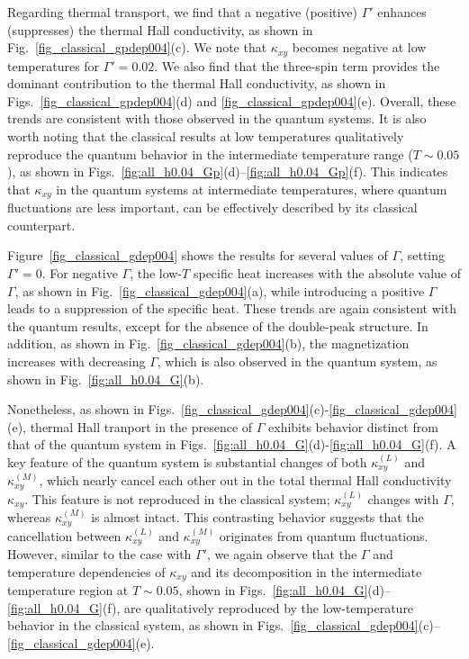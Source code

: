 \documentclass[twocolumn,superscriptaddress,showpacs, longbibliography, aps, prx]{revtex4-2}
\begin{document}
Regarding thermal transport, we find that a negative (positive) $\Gamma'$ enhances (suppresses) the thermal Hall conductivity, as shown in Fig.~\ref{fig_classical_gpdep004}(c).
We note that $\kappa_{xy}$ becomes negative at low temperatures for $\Gamma'=0.02$.
We also find that the three-spin term provides the dominant contribution to the thermal Hall conductivity, as shown in Figs.~\ref{fig_classical_gpdep004}(d) and \ref{fig_classical_gpdep004}(e).
Overall, these trends are consistent with those observed in the quantum systems.
It is also worth noting that the classical results at low temperatures qualitatively reproduce the quantum behavior in the intermediate temperature range ($T\sim 0.05$), as shown in Figs.~\ref{fig:all_h0.04_Gp}(d)--\ref{fig:all_h0.04_Gp}(f). 
This indicates that $\kappa_{xy}$ in the quantum systems at intermediate temperatures, where quantum fluctuations are less important, can be effectively described by its classical counterpart.

Figure~\ref{fig_classical_gdep004} shows the results for several values of $\Gamma$, setting $\Gamma'=0$.
For negative $\Gamma$, the low-$T$ specific heat increases with the absolute value of $\Gamma$, as shown in Fig.~\ref{fig_classical_gdep004}(a), while introducing a positive $\Gamma$ leads to a suppression of the specific heat.
These trends are again consistent with the quantum results, except for the absence of the double-peak structure.
In addition, as shown in Fig.~\ref{fig_classical_gdep004}(b), the magnetization increases with decreasing $\Gamma$, which is also observed in the quantum 
system, as shown in Fig.~\ref{fig:all_h0.04_G}(b).

Nonetheless, as shown in Figs.~\ref{fig_classical_gdep004}(c)-\ref{fig_classical_gdep004}(e), thermal Hall tranport in the presence of $\Gamma$ exhibits behavior distinct from that of the quantum system in Figs.~\ref{fig:all_h0.04_G}(d)-\ref{fig:all_h0.04_G}(f).
A key feature of the quantum system is substantial changes of both $\kappa_{xy}^{(L)}$ and $\kappa_{xy}^{(M)}$, which nearly cancel each other out in the total thermal Hall conductivity $\kappa_{xy}$.
This feature is not reproduced in the classical system; $\kappa_{xy}^{(L)}$ changes with $\Gamma$, whereas $\kappa_{xy}^{(M)}$ is almost intact. 
This contrasting behavior suggests that the cancellation between $\kappa_{xy}^{(L)}$ and $\kappa_{xy}^{(M)}$ originates from quantum fluctuations.
However, similar to the case with $\Gamma'$, we again observe that the $\Gamma$ and temperature dependencies of $\kappa_{xy}$ and its decomposition in the intermediate temperature region at $T \sim0.05$, shown in Figs.~\ref{fig:all_h0.04_G}(d)--\ref{fig:all_h0.04_G}(f), are qualitatively reproduced by the low-temperature behavior in the classical system, as shown in Figs.~\ref{fig_classical_gdep004}(c)--\ref{fig_classical_gdep004}(e).
\end{document}
